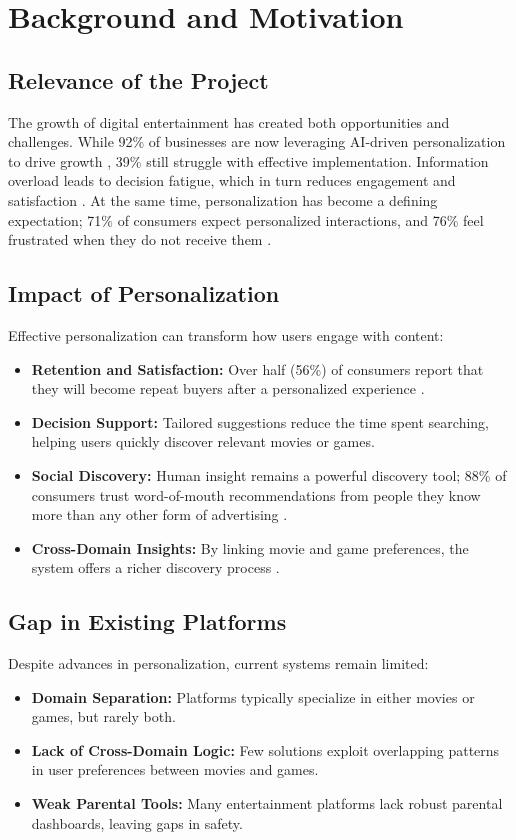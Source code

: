 \section{Background and Motivation}

\subsection{Relevance of the Project}
The growth of digital entertainment has created both opportunities and challenges. While 92\% of businesses are now leveraging AI-driven personalization to drive growth \cite{nielsen2023}, 39\% still struggle with effective implementation. Information overload leads to decision fatigue, which in turn reduces engagement and satisfaction \cite{ref:decision_fatigue}. At the same time, personalization has become a defining expectation; 71\% of consumers expect personalized interactions, and 76\% feel frustrated when they do not receive them \cite{mckinsey2023}.

\subsection{Impact of Personalization}
Effective personalization can transform how users engage with content:
\begin{itemize}
    \item \textbf{Retention and Satisfaction:} Over half (56\%) of consumers report that they will become repeat buyers after a personalized experience \cite{nielsen2023}.
    \item \textbf{Decision Support:} Tailored suggestions reduce the time spent searching, helping users quickly discover relevant movies or games.
    \item \textbf{Social Discovery:} Human insight remains a powerful discovery tool; 88\% of consumers trust word-of-mouth recommendations from people they know more than any other form of advertising \cite{buyapowa2023}.
    \item \textbf{Cross-Domain Insights:} By linking movie and game preferences, the system offers a richer discovery process \cite{ref:cross_domain_survey}.
\end{itemize}

\subsection{Gap in Existing Platforms}
Despite advances in personalization, current systems remain limited:
\begin{itemize}
    \item \textbf{Domain Separation:} Platforms typically specialize in either movies or games, but rarely both.
    \item \textbf{Lack of Cross-Domain Logic:} Few solutions exploit overlapping patterns in user preferences between movies and games.
    \item \textbf{Weak Parental Tools:} Many entertainment platforms lack robust parental dashboards, leaving gaps in safety.
\end{itemize}

